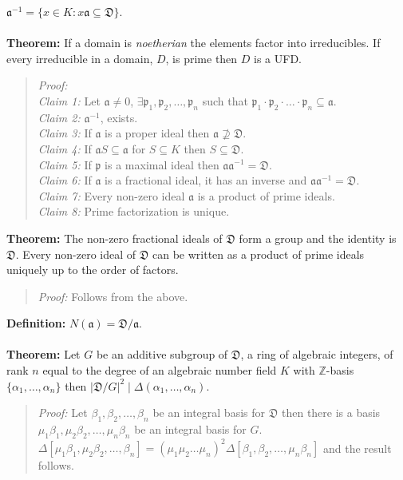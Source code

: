 ${\mathfrak a}^{-1}= \{ x \in K: x {\mathfrak a} \subseteq {\mathfrak D} \}$.
\\
\\
{\bf Theorem:}  If a domain is \emph{noetherian} the elements factor into irreducibles.
If every irreducible in a domain, $D$, is prime then $D$ is a UFD.
\begin{quote}
\emph{Proof:}  
\\
\emph{Claim 1:}
Let ${\mathfrak a} \ne 0$, $\exists
{\mathfrak p}_1 , 
{\mathfrak p}_2 , \ldots ,
{\mathfrak p}_n $ 
such that
$ {\mathfrak p}_1 \cdot {\mathfrak p}_2 \cdot \ldots \cdot{\mathfrak p}_n  \subseteq {\mathfrak a}$.
\\
\emph{Claim 2:}
${\mathfrak a}^{-1}$, exists.
\\
\emph{Claim 3:}
If ${\mathfrak a}$ is a proper ideal then
${\mathfrak a} \nsupseteq {\mathfrak D}$.
\\
\emph{Claim 4:}
If 
${\mathfrak a} S \subseteq {\mathfrak a}$ for
$S \subseteq K$ then
$S \subseteq {\mathfrak D}$.
\\
\emph{Claim 5:}
If ${\mathfrak p}$ is a maximal ideal then
${\mathfrak a} {\mathfrak a}^{-1} = {\mathfrak D}$.
\\
\emph{Claim 6:}
If
${\mathfrak a}$ is a fractional ideal, it has an inverse and
${\mathfrak a} {\mathfrak a}^{-1} = {\mathfrak D}$.
\\
\emph{Claim 7:}
Every non-zero ideal ${\mathfrak a}$ is a product of prime ideals.
\\
\emph{Claim 8:}
Prime factorization is unique.
\end{quote}
{\bf Theorem:}
The non-zero fractional ideals of ${\mathfrak D}$ form a group and the identity is
${\mathfrak D}$.  Every non-zero ideal of ${\mathfrak D}$ can be written as a product of prime
ideals uniquely up to the order of factors.
\begin{quote}
\emph{Proof:}  
Follows from the above.
\end{quote}
{\bf Definition:}
$N({\mathfrak a})= {\mathfrak D}/ {\mathfrak a}$.
\\
\\
{\bf Theorem:}  Let $G$ be an additive subgroup of
${\mathfrak D}$, a ring of algebraic integers, of rank $n$ equal to the degree of an
algebraic number field $K$ with ${\mathbb Z}$-basis $\{ \alpha_1 , \ldots , \alpha_n \}$
then $|{\mathfrak D}/G|^2 \mid \Delta(\alpha_1, \ldots , \alpha_n)$.
\begin{quote}
\emph{Proof:}  
Let $\beta_1 , \beta_2 , \ldots , \beta_n$ be an integral basis for ${\mathfrak D}$ then
there is a basis $\mu_1 \beta_1 , \mu_2 \beta_2 , \ldots , \mu_n \beta_n$ be an integral basis for $G$.
$\Delta[\mu_1 \beta_1 , \mu_2 \beta_2 , \ldots , \beta_n] = 
(\mu_1 \mu_2 \ldots \mu_n)^2 \Delta[\beta_1 , \beta_2 , \ldots , \mu_n \beta_n] $ and the result follows.
\end{quote}
